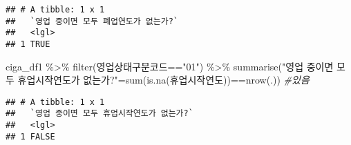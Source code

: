 \documentclass[
]{book}
\newenvironment{Shaded}{\begin{snugshade}}{\end{snugshade}}
\newcommand{\CommentTok}[1]{\textcolor[rgb]{0.56,0.35,0.01}{\textit{#1}}}
\newcommand{\FunctionTok}[1]{\textcolor[rgb]{0.00,0.00,0.00}{#1}}
\newcommand{\NormalTok}[1]{#1}
\newcommand{\OtherTok}[1]{\textcolor[rgb]{0.56,0.35,0.01}{#1}}
\newcommand{\SpecialCharTok}[1]{\textcolor[rgb]{0.00,0.00,0.00}{#1}}
\newcommand{\StringTok}[1]{\textcolor[rgb]{0.31,0.60,0.02}{#1}}
\begin{document}
\begin{verbatim}
## # A tibble: 1 x 1
##   `영업 중이면 모두 폐업연도가 없는가?`
##   <lgl>                                
## 1 TRUE
\end{verbatim}

\begin{Shaded}
\begin{Highlighting}[]
\NormalTok{ciga\_df1 }\SpecialCharTok{\%\textgreater{}\%} 
  \FunctionTok{filter}\NormalTok{(영업상태구분코드}\SpecialCharTok{==}\StringTok{"01"}\NormalTok{) }\SpecialCharTok{\%\textgreater{}\%}
  \FunctionTok{summarise}\NormalTok{(}\StringTok{"영업 중이면 모두 휴업시작연도가 없는가?"}\OtherTok{=}\FunctionTok{sum}\NormalTok{(}\FunctionTok{is.na}\NormalTok{(휴업시작연도))}\SpecialCharTok{==}\FunctionTok{nrow}\NormalTok{(.)) }\CommentTok{\#있음}
\end{Highlighting}
\end{Shaded}

\begin{verbatim}
## # A tibble: 1 x 1
##   `영업 중이면 모두 휴업시작연도가 없는가?`
##   <lgl>                                    
## 1 FALSE
\end{verbatim}

\begin{Shaded}
\end{Shaded}
\end{document}
